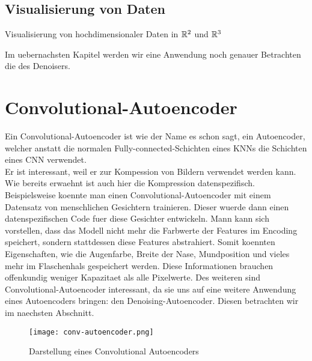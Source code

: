 \subsection{Visualisierung von Daten}
Visualisierung von hochdimensionaler Daten in $\mathbb{R}^2$ und $\mathbb{R}^3$


Im uebernachsten Kapitel werden wir eine Anwendung noch genauer Betrachten die
des Denoisers.

\section{Convolutional-Autoencoder}
Ein Convolutional-Autoencoder ist wie der Name es schon sagt, ein Autoencoder,
welcher anstatt die normalen Fully-connected-Schichten eines KNNs die Schichten eines CNN verwendet. \\
Er ist interessant, weil er zur Kompession von Bildern verwendet werden kann.
Wie bereits erwaehnt ist auch hier die Kompression datenspezifisch.
Beispielsweise koennte man einen Convolutional-Autoencoder mit einem Datensatz
von menschlichen Gesichtern trainieren. Dieser wuerde dann einen
datenspezifischen Code fuer diese Gesichter entwickeln. Mann kann sich
vorstellen, dass das Modell nicht mehr die Farbwerte der Features im Encoding
speichert, sondern stattdessen diese Features abstrahiert. Somit koennten
Eigenschaften, wie die Augenfarbe, Breite der Nase, Mundposition und vieles mehr
im Flaschenhals gespeichert werden. Diese Informationen brauchen offenkundig
weniger Kapazitaet als alle Pixelwerte.
\para{}
Des weiteren sind Convolutional-Autoencoder interessant, da sie uns auf eine
weitere Anwendung eines Autoencoders bringen: den Denoising-Autoencoder.
Diesen betrachten wir im naechsten Abschnitt.

\begin{figure}[h!]
  \centering
  \texttt{[image: conv-autoencoder.png]}
  \caption{Darstellung eines Convolutional Autoencoders}
\end{figure}


\cite{yt:autoencoder_faces}

